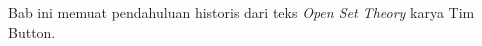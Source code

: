 \documentclass[../../../include/open-logic-chapter]{subfiles}
\begin{document}

\begin{editorial}
Bab ini memuat pendahuluan historis dari teks \emph{Open Set Theory} karya
Tim Button.
\end{editorial}

\end{document}

